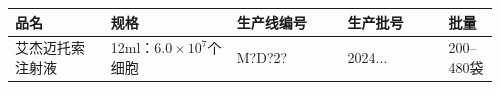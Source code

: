 \documentclass[UTF8,10pt,a4paper,fontset=fandol]{ctexart}
\newcommand{\fieldvalue}[1]{#1}
\newcommand{\handwritten}[1]{#1}
\begin{document}
\begin{center}
\small
\begin{tabular}{|p{0.19\linewidth}|p{0.25\linewidth}|p{0.22\linewidth}|p{0.20\linewidth}|p{0.10\linewidth}|}
\hline
\centering 品名 & \centering 规格 & \centering 生产线编号 & \centering 生产批号 & \centering 批量 \\
\hline
艾杰迈托索注射液
&
12ml：$6.0\times 10^{7}$个细胞
&
\fieldvalue{\handwritten{M?D?2?}}
&
\fieldvalue{\handwritten{2024...}}
&
200--480袋
\\
\hline
\end{tabular}
\end{center}

\vspace{4pt}
\end{document}
